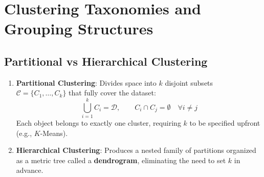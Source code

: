 \section{Clustering Taxonomies and Grouping Structures}
\label{sec:dm-clustering-taxonomies}

\subsection{Partitional vs Hierarchical Clustering}
\begin{enumerate}
    \item \textbf{Partitional Clustering}: Divides space into $k$ disjoint subsets $\mathcal{C} = \{C_1, \dots, C_k\}$ that fully cover the dataset:
    \begin{equation}
        \bigcup_{i=1}^k C_i = \mathcal{D}, \qquad C_i \cap C_j = \emptyset \quad \forall i \neq j
    \end{equation}
    Each object belongs to exactly one cluster, requiring $k$ to be specified upfront (e.g., $K$-Means).
    \item \textbf{Hierarchical Clustering}: Produces a nested family of partitions organized as a metric tree called a \textbf{dendrogram}, eliminating the need to set $k$ in advance.
\end{enumerate}

